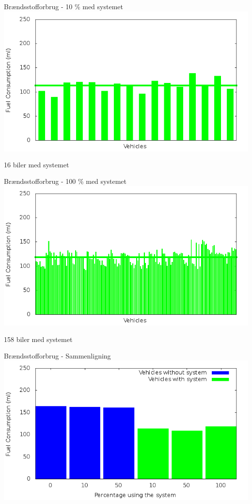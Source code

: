 \begin{frame}{Brændsstofforbrug - 10 \% med systemet}
\includegraphics[width=1\textwidth]{../images/tp0c1_0/fuelRouteControlled10.png}

16 biler med systemet
\end{frame}

\begin{frame}{Brændsstofforbrug - 100 \% med systemet}
\includegraphics[width=1\textwidth]{../images/tp0c1_0/fuelRouteControlled100.png}

158 biler med systemet
\end{frame}

\begin{frame}{Brændsstofforbrug - Sammenligning}
\includegraphics[width=1\textwidth]{../images/tp0c1_0/combinedFuel.png}
\end{frame}

